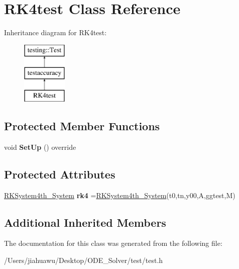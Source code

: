 \hypertarget{class_r_k4test}{}\section{R\+K4test Class Reference}
\label{class_r_k4test}
Inheritance diagram for R\+K4test\+:\begin{figure}[H]
\begin{center}
\leavevmode
\includegraphics[height=3.000000cm]{class_r_k4test}
\end{center}
\end{figure}
\subsection*{Protected Member Functions}
\begin{DoxyCompactItemize}
\item 
\mbox{\label{class_r_k4test_a1a9b748c8134b050e48bb5f455ef272b}} 
void {\bfseries Set\+Up} () override
\end{DoxyCompactItemize}
\subsection*{Protected Attributes}
\begin{DoxyCompactItemize}
\item 
\mbox{\label{class_r_k4test_aa31b776ee582ab28c11f1b16262e536b}} 
\mbox{\hyperlink{class_r_k_system4th___system}{R\+K\+System4th\+\_\+\+System}} {\bfseries rk4} =\mbox{\hyperlink{class_r_k_system4th___system}{R\+K\+System4th\+\_\+\+System}}(t0,tn,y00,A,ggtest,M)
\end{DoxyCompactItemize}
\subsection*{Additional Inherited Members}


The documentation for this class was generated from the following file\+:\begin{DoxyCompactItemize}
\item 
/\+Users/jiahuawu/\+Desktop/\+O\+D\+E\+\_\+\+Solver/test/test.\+h\end{DoxyCompactItemize}
